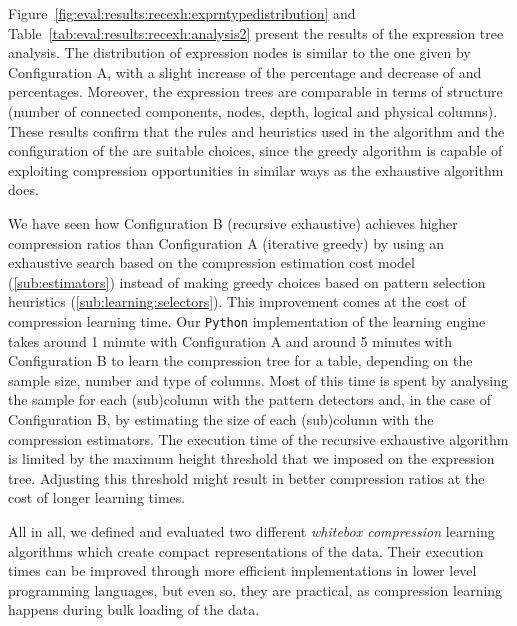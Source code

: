 

Figure~\ref{fig:eval:results:recexh:exprntypedistribution} and Table~\ref{tab:eval:results:recexh:analysis2} present the results of the expression tree analysis. The distribution of expression nodes is similar to the one given by Configuration A, with a slight increase of the  percentage and decrease of  and  percentages. Moreover, the expression trees are comparable in terms of structure (number of connected components, nodes, depth, logical and physical columns). These results confirm that the rules and heuristics used in the  algorithm and the configuration of the  are suitable choices, since the greedy algorithm is capable of exploiting compression opportunities in similar ways as the exhaustive algorithm does.

We have seen how Configuration B (recursive exhaustive) achieves higher compression ratios than Configuration A (iterative greedy) by using an exhaustive search based on the compression estimation cost model (\ref{sub:estimators}) instead of making greedy choices based on pattern selection heuristics (\ref{sub:learning:selectors}). This improvement comes at the cost of compression learning time. Our \verb|Python| implementation of the learning engine takes around 1 minute with Configuration A and around 5 minutes with Configuration B to learn the compression tree for a table, depending on the sample size, number and type of columns. Most of this time is spent by analysing the sample for each (sub)column with the pattern detectors and, in the case of Configuration B, by estimating the size of each (sub)column with the compression estimators. The execution time of the recursive exhaustive algorithm is limited by the maximum height threshold that we imposed on the expression tree. Adjusting this threshold might result in better compression ratios at the cost of longer learning times.

All in all, we defined and evaluated two different \textit{whitebox compression} learning algorithms which create compact representations of the data. Their execution times can be improved through more efficient implementations in lower level programming languages, but even so, they are practical, as compression learning happens during bulk loading of the data.


